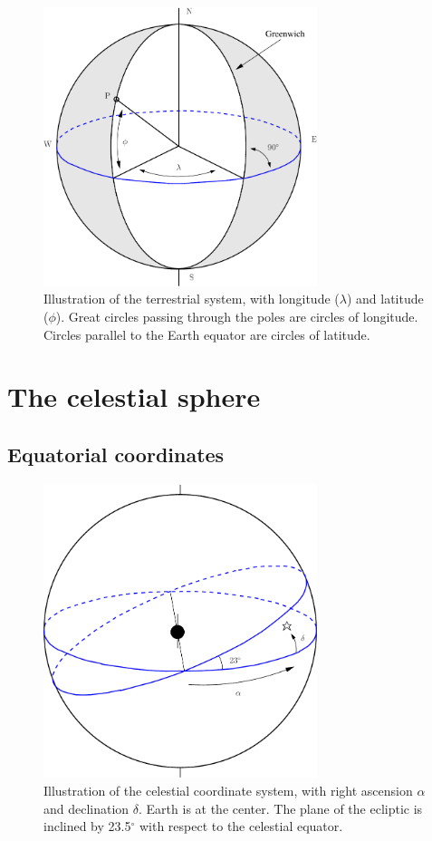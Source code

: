 \begin{figure}[ht]
\begin{center}
\includegraphics[width=8cm]{../figures/longlat.pdf}
\end{center}
\caption{Illustration of the terrestrial system, with longitude
  ($\lambda$) and latitude ($\phi$).  Great circles passing through
  the poles are circles of longitude.  Circles parallel to the Earth
  equator are circles of latitude. }
\label{figearth}
\end{figure}


\section{The celestial sphere}

\subsection{Equatorial coordinates}

\begin{figure}[ht]
\begin{center}
\includegraphics[width=8cm]{../figures/celestial.pdf}
\end{center}
\caption{Illustration of the celestial coordinate system, with right ascension $\alpha$ 
and declination $\delta$. 
Earth is at the center. The plane of the ecliptic is inclined by 23.5$^\circ$ with 
respect to the celestial equator. }
\label{figcelest}
\end{figure}

